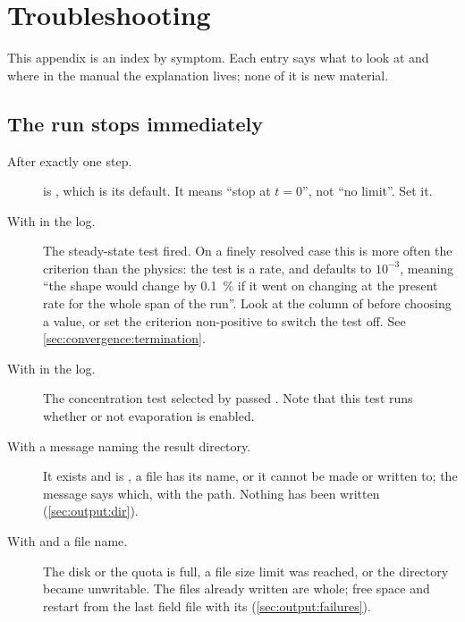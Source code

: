 \chapter{Troubleshooting}
\label{ch:troubleshooting}

This appendix is an index by symptom. Each entry says what to look at and where
in the manual the explanation lives; none of it is new material.

\section{The run stops immediately}
\label{sec:trouble:stops}

\begin{description}
  \item[After exactly one step.]  is , which is
    its default. It means ``stop at $t = 0$'', not ``no limit''. Set it.

  \item[With  in the log.] The steady-state test fired. On
    a finely resolved case this is more often the criterion than the physics:
    the test is a rate, and  defaults to $10^{-3}$,
    meaning ``the shape would change by \SI{0.1}{\percent} if it went on
    changing at the present rate for the whole span of the run''. Look at the  column of
     before choosing a value, or set the criterion
    non-positive to switch the test off. See
    \cref{sec:convergence:termination}.

  \item[With  in the log.] The concentration test selected by
     passed . Note that
    this test runs whether or not evaporation is enabled.

  \item[With a message naming the result directory.] It exists and
     is , a file has its name, or it cannot
    be made or written to; the message says which, with the path. Nothing has
    been written (\cref{sec:output:dir}).

  \item[With  and a file name.] The disk or the quota
    is full, a file size limit was reached, or the directory became
    unwritable. The files already written are whole; free space and restart
    from the last field file with its 
    (\cref{sec:output:failures}).


\end{description}
